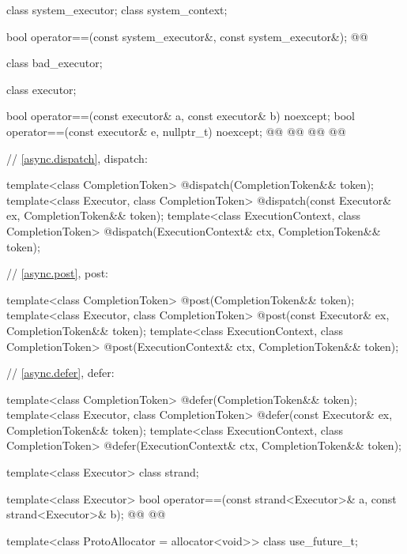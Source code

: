 \begin{codeblock}
{  class system_executor;
  class system_context;

  bool operator==(const system_executor&, const system_executor&);
  @@

  class bad_executor;

  class executor;

  bool operator==(const executor& a, const executor& b) noexcept;
  bool operator==(const executor& e, nullptr_t) noexcept;
  @@
  @@
  @@
  @@

  // \ref{async.dispatch}, dispatch:

  template<class CompletionToken>
    @\DEDUCED@ dispatch(CompletionToken&& token);
  template<class Executor, class CompletionToken>
    @\DEDUCED@ dispatch(const Executor& ex, CompletionToken&& token);
  template<class ExecutionContext, class CompletionToken>
    @\DEDUCED@ dispatch(ExecutionContext& ctx, CompletionToken&& token);

  // \ref{async.post}, post:

  template<class CompletionToken>
    @\DEDUCED@ post(CompletionToken&& token);
  template<class Executor, class CompletionToken>
    @\DEDUCED@ post(const Executor& ex, CompletionToken&& token);
  template<class ExecutionContext, class CompletionToken>
    @\DEDUCED@ post(ExecutionContext& ctx, CompletionToken&& token);

  // \ref{async.defer}, defer:

  template<class CompletionToken>
    @\DEDUCED@ defer(CompletionToken&& token);
  template<class Executor, class CompletionToken>
    @\DEDUCED@ defer(const Executor& ex, CompletionToken&& token);
  template<class ExecutionContext, class CompletionToken>
    @\DEDUCED@ defer(ExecutionContext& ctx, CompletionToken&& token);

  template<class Executor>
    class strand;

  template<class Executor>
    bool operator==(const strand<Executor>& a, const strand<Executor>& b);
  @@
    @@

  template<class ProtoAllocator = allocator<void>>
    class use_future_t;

}
\end{codeblock}
